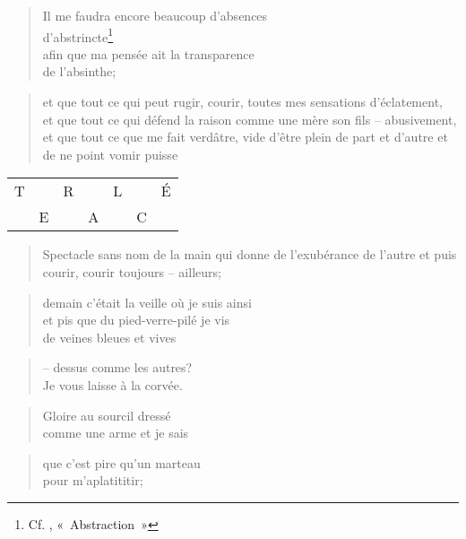   \begin{verse}
    Il me faudra encore beaucoup d’absences\\
    d’abstrincte\footnote{Cf. , «~Abstraction~»}\\
    afin que ma pensée ait la transparence\\
    de l’absinthe;
  \end{verse}
  \begin{verse}
    et que tout ce qui peut rugir, courir, toutes mes sensations d’éclatement,\\
    et que tout ce qui défend la raison comme une mère son fils -- abusivement,\\
    et que tout ce que me fait verdâtre, vide d’être plein de part et d’autre et de ne point vomir puisse
  \end{verse}
  \begin{center}
    \begin{tabular}{ccccccc}
      T &   & R &   & L &   & É\\
        & E &   & A &   & C &
    \end{tabular}{}
  \end{center}
  \begin{verse}
    Spectacle sans nom de la main qui donne
    de l’exubérance de l’autre et puis
    courir, courir toujours -- ailleurs;
  \end{verse}
  \begin{verse}
    demain c’était la veille où je suis ainsi\\
    et pis que du pied-verre-pilé je vis\\
    de veines bleues et vives
  \end{verse}
  \begin{center}
  \end{center}
  \begin{verse}
    -- dessus comme les autres?\\
    Je vous laisse à la corvée.
  \end{verse}
  \begin{verse}
    Gloire au sourcil dressé\\
    comme une arme et je sais
  \end{verse}
  \begin{verse}
    que c’est pire qu’un marteau\\
    pour m’aplatititir;
  \end{verse}
